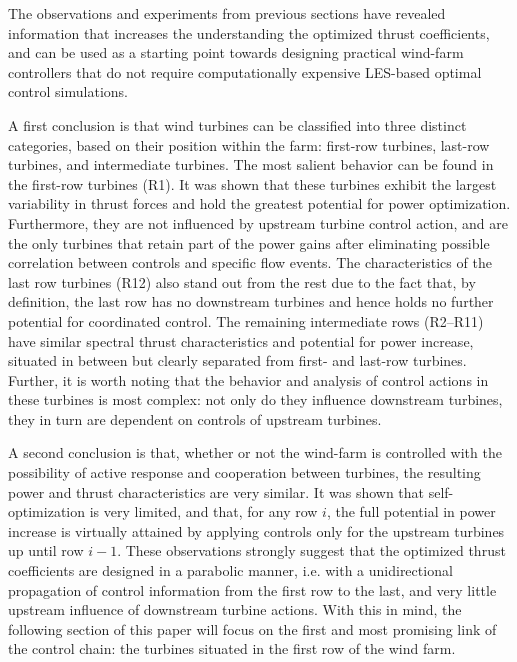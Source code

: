 \documentclass[wes, manuscript]{copernicus}
\begin{document}
The observations and experiments from previous sections have revealed information that increases the understanding the optimized thrust coefficients, and can be used as a starting point towards designing practical wind-farm controllers that do not require computationally expensive LES-based optimal control simulations. 

A first conclusion is that wind turbines can be classified into three distinct categories, based on their position within the farm: first-row turbines, last-row turbines, and intermediate turbines. The most salient behavior can be found in the first-row turbines (R1). It was shown that these turbines exhibit the largest variability in thrust forces and hold the greatest potential for power optimization. Furthermore, they are not influenced by upstream turbine control action, and are the only turbines that retain part of the power gains after eliminating possible correlation between controls and specific flow events.  
The characteristics of the last row turbines (R12) also stand out from the rest due to the fact that, by definition, the last row has no downstream turbines and hence holds no further potential for coordinated control. 
The remaining intermediate rows (R2--R11) have similar spectral thrust characteristics and potential for power increase, situated in between but clearly separated from first- and last-row turbines. Further, it is worth noting that the behavior and analysis of control actions in these turbines is most complex: not only do they influence downstream turbines, they in turn are dependent on controls of upstream turbines. 

A second conclusion is that, whether or not the wind-farm is controlled with the possibility of active response and cooperation between turbines, the resulting power and thrust characteristics are very similar. It was shown that self-optimization is very limited, and that, for any row $i$, the full potential in power increase is virtually attained by applying controls only for the upstream turbines up until row $i-1$. These observations strongly suggest that the optimized thrust coefficients are designed in a parabolic manner, i.e. with a unidirectional propagation of control information from the first row to the last, and very little upstream influence of downstream turbine actions.
With this in mind, the following section of this paper will focus on the first and most promising link of the control chain: the turbines situated in the first row of the wind farm.
\end{document}

